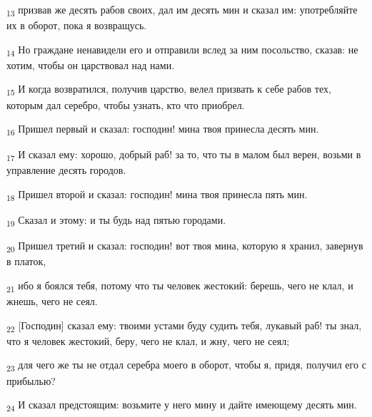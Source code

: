 \begin{tcolorbox}
\textsubscript{13} призвав же десять рабов своих, дал им десять мин и сказал им: употребляйте их в оборот, пока я возвращусь.
\end{tcolorbox}
\begin{tcolorbox}
\textsubscript{14} Но граждане ненавидели его и отправили вслед за ним посольство, сказав: не хотим, чтобы он царствовал над нами.
\end{tcolorbox}
\begin{tcolorbox}
\textsubscript{15} И когда возвратился, получив царство, велел призвать к себе рабов тех, которым дал серебро, чтобы узнать, кто что приобрел.
\end{tcolorbox}
\begin{tcolorbox}
\textsubscript{16} Пришел первый и сказал: господин! мина твоя принесла десять мин.
\end{tcolorbox}
\begin{tcolorbox}
\textsubscript{17} И сказал ему: хорошо, добрый раб! за то, что ты в малом был верен, возьми в управление десять городов.
\end{tcolorbox}
\begin{tcolorbox}
\textsubscript{18} Пришел второй и сказал: господин! мина твоя принесла пять мин.
\end{tcolorbox}
\begin{tcolorbox}
\textsubscript{19} Сказал и этому: и ты будь над пятью городами.
\end{tcolorbox}
\begin{tcolorbox}
\textsubscript{20} Пришел третий и сказал: господин! вот твоя мина, которую я хранил, завернув в платок,
\end{tcolorbox}
\begin{tcolorbox}
\textsubscript{21} ибо я боялся тебя, потому что ты человек жестокий: берешь, чего не клал, и жнешь, чего не сеял.
\end{tcolorbox}
\begin{tcolorbox}
\textsubscript{22} [Господин] сказал ему: твоими устами буду судить тебя, лукавый раб! ты знал, что я человек жестокий, беру, чего не клал, и жну, чего не сеял;
\end{tcolorbox}
\begin{tcolorbox}
\textsubscript{23} для чего же ты не отдал серебра моего в оборот, чтобы я, придя, получил его с прибылью?
\end{tcolorbox}
\begin{tcolorbox}
\textsubscript{24} И сказал предстоящим: возьмите у него мину и дайте имеющему десять мин.
\end{tcolorbox}
